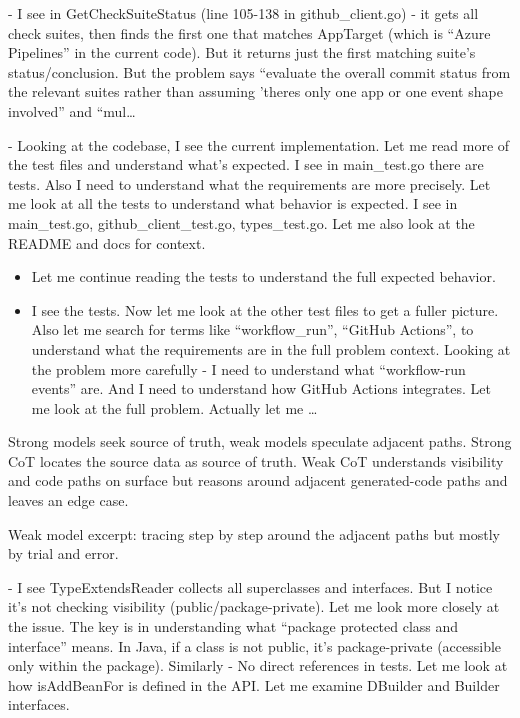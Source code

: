 \documentclass[
  10
]{article}
\begin{document}
- I see in GetCheckSuiteStatus (line 105-138 in github\_client.go) - it
gets all check suites, then finds the first one that matches AppTarget
(which is ``Azure Pipelines'' in the current code). But it returns just
the first matching suite's status/conclusion. But the problem says
``evaluate the overall commit status from the relevant suites rather
than assuming 'theres only one app or one event shape involved'' and
``mul\ldots{}

- Looking at the codebase, I see the current implementation. Let me read
more of the test files and understand what's expected. I see in
main\_test.go there are tests. Also I need to understand what the
requirements are more precisely. Let me look at all the tests to
understand what behavior is expected. I see in main\_test.go,
github\_client\_test.go, types\_test.go. Let me also look at the README
and docs for context.

\begin{itemize}
\item
  Let me continue reading the tests to understand the full expected
  behavior.
\item
  I see the tests. Now let me look at the other test files to get a
  fuller picture. Also let me search for terms like ``workflow\_run'',
  ``GitHub Actions'', to understand what the requirements are in the
  full problem context. Looking at the problem more carefully - I need
  to understand what ``workflow-run events'' are. And I need to
  understand how GitHub Actions integrates. Let me look at the full
  problem. Actually let me \ldots{}
\end{itemize}

Strong models seek source of truth, weak models speculate adjacent
paths. Strong CoT locates the source data as source of truth. Weak CoT
understands visibility and code paths on surface but reasons around
adjacent generated-code paths and leaves an edge case.

Weak model excerpt: tracing step by step around the adjacent paths but
mostly by trial and error.

- I see TypeExtendsReader collects all superclasses and interfaces. But
I notice it's not checking visibility (public/package-private). Let me
look more closely at the issue. The key is in understanding what
``package protected class and interface'' means. In Java, if a class is
not public, it's package-private (accessible only within the package).
Similarly - No direct references in tests. Let me look at how
isAddBeanFor is defined in the API. Let me examine DBuilder and Builder
interfaces.
\end{document}
